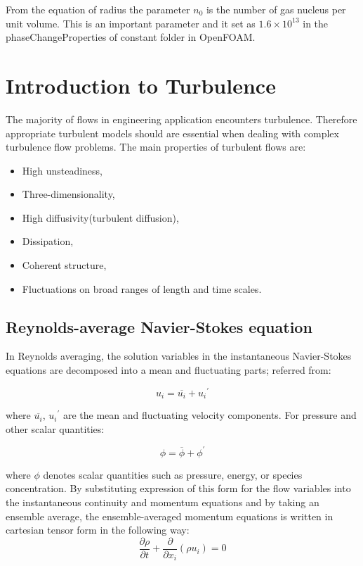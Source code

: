 From the equation of radius the parameter $n_0$ is the number of gas
nucleus per unit volume. This is an important parameter and it set as
$1.6 \times 10^{13}$ in the phaseChangeProperties of constant folder in OpenFOAM.
  
\section{Introduction to Turbulence}

The majority of flows in engineering application encounters
turbulence\cite{ANSYS}. Therefore appropriate turbulent models should
are essential when dealing with complex turbulence flow problems.  The
main properties of turbulent flows are:

\begin{itemize}
\item High unsteadiness,
\item Three-dimensionality,
\item High diffusivity(turbulent diffusion),
\item Dissipation,
\item Coherent structure,
\item Fluctuations on broad ranges of length and time scales.
\end{itemize}
\subsection{Reynolds-average Navier-Stokes equation}

In Reynolds averaging, the solution variables in the instantaneous Navier-Stokes equations are 
decomposed into a mean and fluctuating parts; referred
from\cite{pope2000,ANSYS}:

\begin{equation}
{u_i}={\overline{u_i}}+{{u_i}^\prime}
\end{equation}

where ${\overline{u_i}}$, ${{u_i}^\prime}$ are the mean and
fluctuating velocity components.  For pressure and other scalar
quantities:

\begin{equation}
\phi ={\overline{\phi}}+{{\phi}^\prime}
\end{equation}

where $\phi$ denotes scalar quantities such as pressure, energy, or
species concentration. By substituting expression of this form for the
flow variables into the instantaneous continuity and momentum
equations and  by taking an ensemble average, the ensemble-averaged
momentum equations is written in cartesian tensor form in the following way:
\begin{equation}
{{\frac{\partial \rho}{\partial t}}+{\frac{\partial}{\partial {x_i}}}(\rho u_i)}=0
\end{equation}

